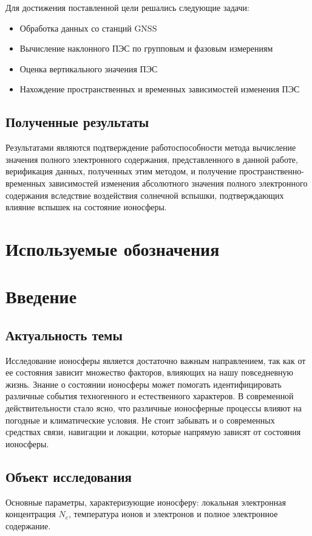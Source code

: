 \documentclass[a4paper]{article}
\begin{document}
Для достижения поставленной цели решались следующие задачи:
\begin{itemize}
\item Обработка данных со станций GNSS
\item Вычисление наклонного ПЭС по групповым и фазовым измерениям
\item Оценка вертикального значения ПЭС
\item Нахождение пространственных и временных зависимостей изменения ПЭС
\end{itemize}

\subsection*{Полученные результаты}
Результатами являются подтверждение работоспособности метода вычисление значения полного электронного содержания, представленного в данной работе, верификация данных, полученных этим методом, и получение пространственно-временных зависимостей изменения абсолютного значения полного электронного содержания вследствие воздействия солнечной вспышки, подтверждающих влияние вспышек на состояние ионосферы.

\newpage
\tableofcontents

\newpage
\section*{Используемые обозначения}

\newpage
\section*{Введение}
\subsection*{Актуальность темы}
Исследование ионосферы является достаточно важным направлением, так как от ее состояния зависит множество факторов, влияющих на нашу повседневную жизнь. Знание о состоянии ионосферы может помогать идентифицировать различные события техногенного и естественного характеров. В современной действительности стало ясно, что различные ионосферные процессы влияют на погодные и климатические условия. Не стоит забывать и о современных средствах связи, навигации и локации, которые напрямую зависят от состояния ионосферы.

\subsection*{Объект исследования}
Основные параметры, характеризующие ионосферу: локальная электронная концентрация $N_e$, температура ионов и электронов и полное электронное содержание.
\end{document}
